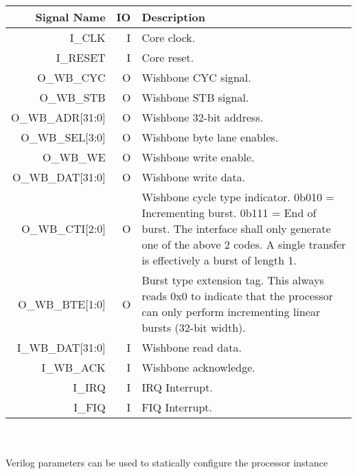 \documentclass[10pt]{article}
\begin{document}
\begin{tabularx} {\linewidth}{|r|r|X|}
\hline
Signal Name & IO & Description \\ \hline

I\_CLK &
I &
Core clock. \\ \hline

I\_RESET &
I &
Core reset. \\ \hline

O\_WB\_CYC &
O &
Wishbone CYC signal. \\ \hline

O\_WB\_STB &
O & 
Wishbone STB signal. \\ \hline

O\_WB\_ADR[31:0] &
O &
Wishbone 32-bit address. \\ \hline

O\_WB\_SEL[3:0] &
O &
Wishbone byte lane enables. \\ \hline

O\_WB\_WE &
O &
Wishbone write enable. \\ \hline

O\_WB\_DAT[31:0] &
O &
Wishbone write data. \\ \hline

O\_WB\_CTI[2:0] &
O &
Wishbone cycle type indicator. \newline
0b010 = Incrementing burst. \newline
0b111 = End of burst. \newline
The interface shall only generate one of the above 2 codes. 
A single transfer is effectively a burst of length 1.\\ \hline

O\_WB\_BTE[1:0] &
O &
Burst type extension tag. This always reads 0x0 to indicate that
the processor can only perform incrementing linear bursts (32-bit width). 
\\ \hline

I\_WB\_DAT[31:0] &
I &
Wishbone read data. \\ \hline

I\_WB\_ACK &
I &
Wishbone acknowledge. \\ \hline

I\_IRQ &
I  &
IRQ Interrupt. \\ \hline

I\_FIQ &
I &
FIQ Interrupt. \\ \hline
\end{tabularx}
\\
\\
Verilog parameters can be used to statically configure the processor instance
\end{document}
